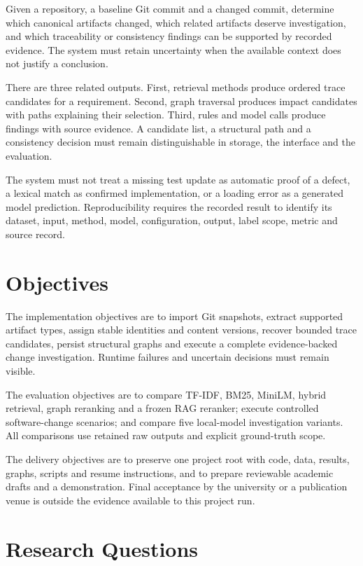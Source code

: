 \documentclass[
  11pt,
  a4paper,
]{report}
\begin{document}
Given a repository, a baseline Git commit and a changed commit,
determine which canonical artifacts changed, which related artifacts
deserve investigation, and which traceability or consistency findings
can be supported by recorded evidence. The system must retain
uncertainty when the available context does not justify a conclusion.

There are three related outputs. First, retrieval methods produce
ordered trace candidates for a requirement. Second, graph traversal
produces impact candidates with paths explaining their selection. Third,
rules and model calls produce findings with source evidence. A candidate
list, a structural path and a consistency decision must remain
distinguishable in storage, the interface and the evaluation.

The system must not treat a missing test update as automatic proof of a
defect, a lexical match as confirmed implementation, or a loading error
as a generated model prediction. Reproducibility requires the recorded
result to identify its dataset, input, method, model, configuration,
output, label scope, metric and source record.

\hypertarget{objectives}{%
\chapter{Objectives}\label{objectives}}

The implementation objectives are to import Git snapshots, extract
supported artifact types, assign stable identities and content versions,
recover bounded trace candidates, persist structural graphs and execute
a complete evidence-backed change investigation. Runtime failures and
uncertain decisions must remain visible.

The evaluation objectives are to compare TF-IDF, BM25, MiniLM, hybrid
retrieval, graph reranking and a frozen RAG reranker; execute controlled
software-change scenarios; and compare five local-model investigation
variants. All comparisons use retained raw outputs and explicit
ground-truth scope.

The delivery objectives are to preserve one project root with code,
data, results, graphs, scripts and resume instructions, and to prepare
reviewable academic drafts and a demonstration. Final acceptance by the
university or a publication venue is outside the evidence available to
this project run.

\hypertarget{research-questions}{%
\chapter{Research Questions}\label{research-questions}}
\end{document}
